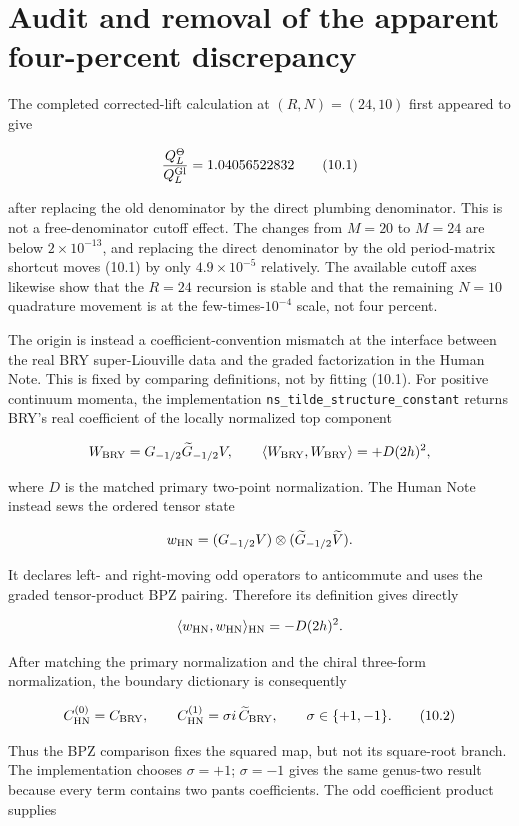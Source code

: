 \documentclass[11pt]{article}
\begin{document}
\section{Audit and removal of the apparent four-percent discrepancy}

The completed corrected-lift calculation at \((R,N)=(24,10)\) first appeared
to give

\[
 \frac{Q_L^\Theta}{Q_L^{\rm Gl}}=1.04056522832
 \tag{10.1}
\]

after replacing the old denominator by the direct plumbing denominator.
This is not a free-denominator cutoff effect.  The changes from \(M=20\) to
\(M=24\) are below \(2\times10^{-13}\), and replacing the direct denominator
by the old period-matrix shortcut moves (10.1) by only
\(4.9\times10^{-5}\) relatively.  The available cutoff axes likewise show
that the \(R=24\) recursion is stable and that the remaining \(N=10\)
quadrature movement is at the few-times-\(10^{-4}\) scale, not four percent.

The origin is instead a coefficient-convention mismatch at the interface
between the real BRY super-Liouville data and the graded factorization in the
Human Note.  This is fixed by comparing definitions, not by fitting (10.1).
For positive continuum momenta, the implementation
\texttt{ns\_tilde\_structure\_constant} returns BRY's real coefficient of the
locally normalized top component

\[
 W_{\rm BRY}=G_{-1/2}\widetilde G_{-1/2}V,
 \qquad
 \langle W_{\rm BRY},W_{\rm BRY}\rangle=+D(2h)^2,
\]

where $D$ is the matched primary two-point normalization.  The Human Note
instead sews the ordered tensor state

\[
 w_{\rm HN}=(G_{-1/2}V)\otimes
 (\widetilde G_{-1/2}\widetilde V).
\]

It declares left- and right-moving odd operators to anticommute and uses the
graded tensor-product BPZ pairing.  Therefore its definition gives directly

\[
 \langle w_{\rm HN},w_{\rm HN}\rangle_{\rm HN}=-D(2h)^2.
\]

After matching the primary normalization and the chiral three-form
normalization, the boundary dictionary is consequently

\[
 C_{\rm HN}^{(0)}=C_{\rm BRY},\qquad
 C_{\rm HN}^{(1)}=\sigma i\,\widetilde C_{\rm BRY},
 \qquad \sigma\in\{+1,-1\}.
\tag{10.2}
\]

Thus the BPZ comparison fixes the squared map, but not its square-root branch.
The implementation chooses \(\sigma=+1\); \(\sigma=-1\) gives the same
genus-two result because every term contains two pants coefficients.  The odd
coefficient product supplies
\end{document}

